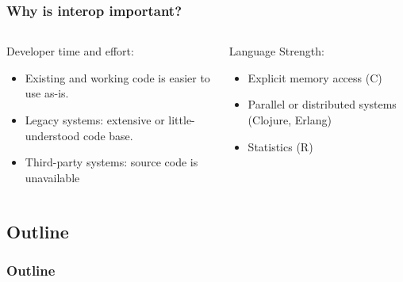 \documentclass{beamer}
\begin{document}
\begin{frame}
  \frametitle{Why is interop important?}
  
  \begin{columns}[t]
  \begin{column}{0.5\textwidth}
  Developer time and effort:
  \begin{itemize}
	\item Existing and working code is easier to use as-is.
	\item Legacy systems: extensive or little-understood code base.
  	\item Third-party systems: source code is unavailable

  \end{itemize}
  \end{column}

  \begin{column}{0.6\textwidth}
  Language Strength:
  \begin{itemize}
  	\item Explicit memory access (C)
  	\item Parallel or distributed systems (Clojure, Erlang)
  	\item Statistics (R)
  \end{itemize}
  \end{column}
  \end{columns}
%

  
\end{frame}

\subsection*{Outline}

\begin{frame}
  \frametitle{Outline}
  \tableofcontents[hideallsubsections]
\end{frame}
\end{document}
